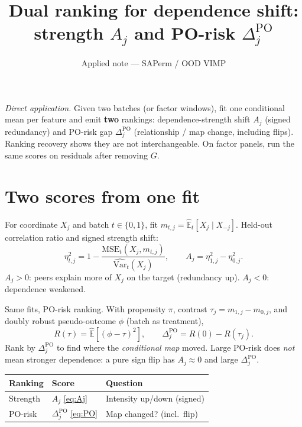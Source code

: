 \documentclass[11pt]{article}
\begin{document}
\title{Dual ranking for dependence shift:\\ strength $A_j$ and PO-risk $\Delta^{\mathrm{PO}}_j$}
\author{Applied note --- SAPerm / OOD VIMP}
\date{}
\maketitle

\noindent\textit{Direct application.} Given two batches (or factor windows), fit one
conditional mean per feature and emit \textbf{two} rankings: dependence-strength
shift $A_j$ (signed redundancy) and PO-risk gap $\Delta^{\mathrm{PO}}_j$
(relationship / map change, including flips). Ranking recovery shows they are not
interchangeable. On factor panels, run the same scores on residuals after removing $G$.

\section{Two scores from one fit}

For coordinate $X_j$ and batch $t\in\{0,1\}$, fit $m_{t,j}=\widehat{\mathbb{E}}_t[X_j\mid X_{-j}]$.
Held-out correlation ratio and signed strength shift:
\begin{equation}
\eta^{2}_{t,j}=1-\frac{\mathrm{MSE}_t(X_j,m_{t,j})}{\widehat{\mathrm{Var}}_t(X_j)},
\qquad
A_j=\eta^{2}_{1,j}-\eta^{2}_{0,j}.
\label{eq:Aj}
\end{equation}
$A_j>0$: peers explain more of $X_j$ on the target (redundancy up).
$A_j<0$: dependence weakened.

Same fits, PO-risk ranking. With propensity $\pi$, contrast $\tau_j=m_{1,j}-m_{0,j}$,
and doubly robust pseudo-outcome $\phi$ (batch as treatment),
\begin{equation}
R(\tau)=\widehat{\mathbb{E}}[(\phi-\tau)^2],
\qquad
\Delta^{\mathrm{PO}}_j=R(0)-R(\tau_j).
\label{eq:PO}
\end{equation}
Rank by $\Delta^{\mathrm{PO}}_j$ to find where the \emph{conditional map} moved.
Large PO-risk does \emph{not} mean stronger dependence: a pure sign flip has $A_j\approx 0$
and large $\Delta^{\mathrm{PO}}_j$.

\begin{center}
\begin{tabular}{lll}
\toprule
Ranking & Score & Question \\
\midrule
Strength & $A_j$ \eqref{eq:Aj} & Intensity up/down (signed) \\
PO-risk & $\Delta^{\mathrm{PO}}_j$ \eqref{eq:PO} & Map changed? (incl.\ flip) \\
\bottomrule
\end{tabular}
\end{center}
\end{document}
